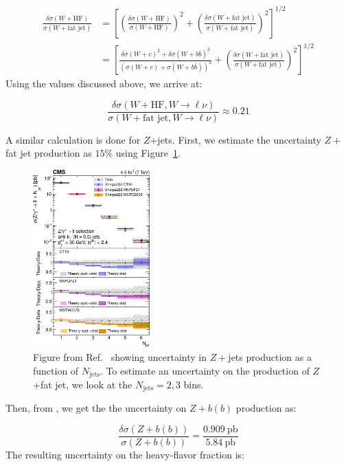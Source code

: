 \begin{align*}
  \frac{\delta\sigma(W+\text{HF})}{\sigma(W+\text{fat jet})} &= \left[ \left(\frac{\delta\sigma(W+\text{HF})}{\sigma(W+\text{HF})}\right)^2 + \left(\frac{\delta\sigma(W+\text{fat jet})}{\sigma(W+\text{fat jet})}\right)^2  \right]^{1/2} \nonumber\\
            &= \left[ \frac{\delta\sigma(W+c)^2+\delta\sigma(W+b\bar{b})^2}{\left(\sigma(W+c) + \sigma(W+b\bar{b})\right)^2} + \left(\frac{\delta\sigma(W+\text{fat jet})}{\sigma(W+\text{fat jet})}\right)^2  \right]^{1/2}
\end{align*}
Using the values discussed above, we arrive at:

\begin{equation}
  \frac{\delta\sigma(W+\text{HF}, W\rightarrow \ell\nu)}{\sigma(W+\text{fat jet}, W\rightarrow \ell\nu)} \approx 0.21
\end{equation}

A similar calculation is done for $Z$+jets.
First, we estimate the uncertainty $Z+$fat jet production \cite{CERN-PH-EP-2014-205} as $15\%$ using Figure~\ref{fig:znjets}.

\begin{figure}[htbp]
  \centering
  \includegraphics[width=0.4\textwidth]{figures/znjets.png}
  \caption{Figure from Ref.~\cite{CERN-PH-EP-2014-205} showing uncertainty in $Z+$jets production as a function of $N_\text{jets}$. To estimate an uncertainty on the production of $Z$+fat jet, we look at the $N_\text{jets}=2,3$ bins.}
  \label{fig:znjets}
\end{figure}

Then, from \cite{CERN-PH-EP-2014-005}, we get the the uncertainty on $Z+b(b)$ production as:

\begin{equation}
  \frac{\delta\sigma(Z+b(b))}{\sigma(Z+b(b))} = \frac{0.909~\text{pb}}{5.84~\text{pb}}
\end{equation}
The resulting uncertainty on the heavy-flavor fraction is:

